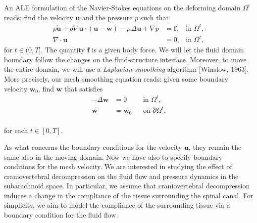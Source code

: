 \documentclass[a4paper,11pt,oneside]{book}
\begin{document}
An ALE formulation of the Navier-Stokes equations on the deforming
domain $\Omega^t$ reads: find the velocity $\mathbf{u}$ and the
pressure $p$ such that
\begin{align}
  \label{eq:ns:1}
  \rho \dot{\mathbf{u}}
  + \rho \nabla \mathbf{u} \cdot (\mathbf{u} - \mathbf{w})
  - \mu \Delta \mathbf{u} + \nabla p
  &= \mathbf{f},  & \text{in } \Omega^t, \\
  \label{eq:ns:2}
  \nabla \cdot \mathbf{u} &= 0, & \text{in } \Omega^t,
\end{align}
for $t \in (0, T]$. The quantity $\mathbf{f}$ is a given body force.
We will let the fluid domain boundary follow the changes on the
fluid-structure interface. Moreover, to move the entire domain, we
will use a \emph{Laplacian smoothing}
algorithm [Winslow, 1963]. More precisely, our mesh smoothing
equation reads: given some boundary velocity $\mathbf{w}_0$, find
$\mathbf{w}$ that satisfies
\begin{align}
\label{eq:bc:2}
- \Delta \mathbf{w} &= 0 	&& \text{in } \Omega^t, \\
\mathbf{w} &= \mathbf{w}_0 && \text{on } \partial \Omega^t .
\end{align}
\\
for each $t \in [0, T]$.



As what concerns the boundary conditions for the velocity $\mathbf{u}$, they remain the same also in the moving domain.
Now we have also to specify boundary conditions for the mesh velocity. We are interested in studying the effect of craniovertebral
decompression on the fluid flow and pressure dynamics in the
subarachnoid space. In particular, we assume that craniovertebral
decompression induces a change in the compliance of the tissue
surrounding the spinal canal. For simplicity, we aim to model
the compliance of the surrounding tissue via a boundary condition for
the fluid flow. 
\end{document}

